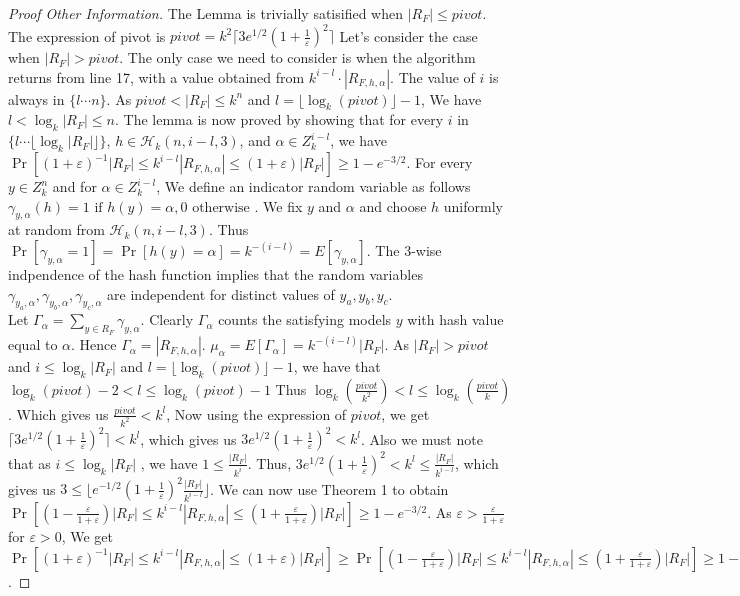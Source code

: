 \documentclass{article}
\begin{document}
\begin{proof}[Proof Other Information]
	The Lemma is trivially satisified when $|R_F| \leq pivot$. The expression of pivot is $pivot = k^2 \lceil 3e^{1/2}(1 + \frac{1}{\varepsilon})^2 \rceil$
	Let's consider the case when $|R_F| > pivot$. The only case we need to consider is when the algorithm returns from line 17, with a value obtained from $k^{i - l} \cdot |R_{F,h,\alpha}|$. The value of $i$ is always in $\{l\cdots n\}$.
	As $pivot < |R_F| \leq k^n$ and $l =\lfloor \log _{k}(pivot) \rfloor - 1 $, We have $l < \log_k |R_F| \leq n$. The lemma is now proved by showing that for every $i$ in $\{l\cdots \lfloor \log_k|R_F| \rfloor \}$, $h \in \mathcal{H}_k(n, i - l, 3)$, and $\alpha \in Z_{k}^{i - l}$, we have
	$\Pr[(1 + \varepsilon)^{-1}|R_F| \leq k^{i - l} |R_{F,h,\alpha}| \leq (1 + \varepsilon)|R_F| ] \geq 1 - e^{-3/2}$. For every $y \in Z_{k}^{n}$ and for $\alpha \in Z_{k}^{i - l}$, We define an indicator random variable as follows
	$\gamma_{y,\alpha}(h) = 1 \text{ if } h(y) = \alpha, 0 \text{ otherwise }$. We fix $y$ and $\alpha$ and choose $h$ uniformly at random from $\mathcal{H}_k(n, i - l, 3)$. Thus $\Pr[\gamma_{y,\alpha} = 1] = \Pr[h(y) = \alpha] = k^{-(i - l)} = E[\gamma_{y,\alpha}]$.
	The 3-wise indpendence of the hash function implies that the random variables $\gamma_{y_a,\alpha}, \gamma_{y_b,\alpha}, \gamma_{y_c,\alpha}$ are independent for distinct values of $y_a, y_b, y_c$.\\
	Let $\Gamma_\alpha = \sum_{y \in R_F} \gamma_{y, \alpha}$. Clearly $\Gamma_\alpha$ counts the satisfying models $y$ with hash value equal to $\alpha$. Hence $\Gamma_\alpha = |R_{F,h,\alpha}|$. $\mu_{\alpha} = E[\Gamma_{\alpha}] = k^{-(i - l)}|R_F|$. As $|R_F| > pivot$ and $i \leq \log_k |R_F|$ and $l = \lfloor\log_k(pivot)\rfloor - 1$, we have that $\log_k(pivot) - 2 < l \leq \log_k(pivot) - 1$
	Thus $\log_k(\frac{pivot}{k^2}) < l \leq \log_k(\frac{pivot}{k})$. Which gives us $\frac{pivot}{k^2} < k^l$, Now using the expression of $pivot$, we get $\lceil 3e^{1/2}(1 + \frac{1}{\varepsilon})^2\rceil < k^l$, which gives us $3e^{1/2}(1 + \frac{1}{\varepsilon})^2 < k^l$. Also we must note that as $i\leq \log_k |R_F|$ , we have $1 \leq \frac{|R_F|}{k^i}$. Thus, $3e^{1/2}(1 + \frac{1}{\varepsilon})^2 < k^l \leq \frac{|R_F|}{k^{i - l}}$, which gives us $3 \leq \lfloor e^{-1/2}(1 + \frac{1}{\varepsilon})^2\frac{|R_F|}{k^{i - l}}\rfloor$. 
	We can now use Theorem 1 to obtain $\Pr[(1 - \frac{\varepsilon}{1 + \varepsilon})|R_F| \leq k^{i - l} |R_{F,h,\alpha}| \leq (1 + \frac{\varepsilon}{1 + \varepsilon})|R_F|  ] \geq 1 - e^{-3/2}$. As $\varepsilon > \frac{\varepsilon}{1 + \varepsilon}$ for $\varepsilon > 0$, We get $\Pr[(1 + \varepsilon)^{-1}|R_F| \leq k^{i - l} |R_{F,h,\alpha}| \leq (1 + \varepsilon)|R_F| ] \geq \Pr[(1 - \frac{\varepsilon}{1 + \varepsilon})|R_F| \leq k^{i - l} |R_{F,h,\alpha}| \leq (1 + \frac{\varepsilon}{1 + \varepsilon})|R_F|  ] \geq 1 - e^{-3/2}$.

	
\end{proof}
\end{document}
